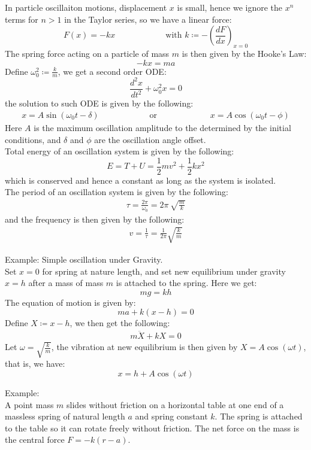 \documentclass[11pt,oneside]{book}
\theoremstyle{break}
\theoremstyle{break}
\newcommand{\example}{\color{green}Example: \color{black}}
\begin{document}
In particle oscillaiton motions, displacement $x$ is small, hence we ignore the $x^n$ terms for $n>1$ in the Taylor series, so we have a linear force:
$$F(x) = -kx\qquad\qquad\qquad\text{with }k\coloneqq -\left(\frac{dF}{dx}\right)_{x=0}$$
The spring force acting on a particle of mass $m$ is then given by the Hooke's Law:
$$-kx = ma$$
Define $\omega_0^2 \coloneqq \frac{k}{m}$, we get a second order ODE:
$$\frac{d^2x}{dt^2}+\omega_0^2 x = 0$$
the solution to such ODE is given by the following:
\begin{align*}
x = A\sin(\omega_0 t -\delta) \qquad\qquad\qquad \text{or }\qquad\qquad\qquad x = A\cos(\omega_0 t-\phi)
\end{align*}
Here $A$ is the maximum oscillation amplitude to the determined by the initial conditions, and $\delta$ and $\phi$ are the oscillation angle offset.\\

Total energy of an oscillation system is given by the following:
$$E = T+U = \frac{1}{2}mv^2 + \frac{1}{2}kx^2$$
which is conserved and hence a constant as long as the system is isolated.\\

The period of an oscillation system is given by the following:
\begin{align*}
\tau = \frac{2\pi}{\omega_0} = 2\pi \, \sqrt{\frac{m}{k}}
\end{align*}
and the frequency is then given by the following:
\begin{align*}
v = \frac{1}{\tau} = \frac{1}{2\pi}\sqrt{\frac{k}{m}}
\end{align*}


\example Simple oscillation under Gravity.\\
Set $x=0$ for spring at nature length, and set new equilibrium under gravity $x=h$ after a mass of mass $m$ is attached to the spring. Here we get: 
$$mg = kh$$
The equation of motion is given by:
$$ma + k(x-h) = 0$$
Define $X\coloneqq x-h$, we then get the following:
\begin{align*}
m\ddot{X}+kX = 0
\end{align*}
Let $\omega = \sqrt{\frac{k}{m}}$, the vibration at new equilibrium is then given by $X=A\cos(\omega t)$, that is, we have:
$$x = h+A\cos(\omega t)$$
\newpage


\example\\
A point mass $m$ slides without friction on a horizontal table at one end of a massless spring of natural length $a$ and spring constant $k$. The spring is attached to the table so it can rotate freely without friction. The net force on the mass is the central force $F=-k(r-a)$.\\
\end{document}
